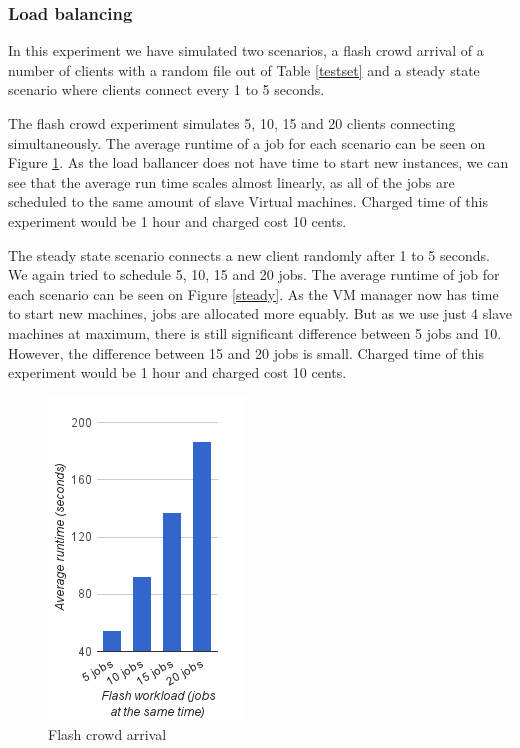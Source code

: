 
\subsubsection{Load balancing}
\label{load}
In this experiment we have simulated two scenarios, a flash crowd arrival of a number of clients with a random file out of Table \ref{testset} and a steady state scenario where clients connect every 1 to 5 seconds. 

The flash crowd experiment simulates 5, 10, 15 and 20 clients connecting simultaneously. The average runtime of a job for each scenario can be seen on Figure \ref{flash}. As the load ballancer does not have time to start new instances, we can see that the average run time scales almost linearly, as all of the jobs are scheduled to the same amount of slave Virtual machines. Charged time of this experiment would be 1 hour and charged cost 10 cents.

The steady state scenario connects a new client randomly after 1 to 5 seconds. We again tried to schedule 5, 10, 15 and 20 jobs. The average runtime of job for each scenario can be seen on Figure \ref{steady}. As the VM manager now has time to start new machines, jobs are allocated more equably. But as we use just 4 slave machines at maximum, there is still significant difference between 5 jobs and 10. However, the difference between 15 and 20 jobs is small. Charged time of this experiment would be 1 hour and charged cost 10 cents.

\begin{figure}
 \centering

 \includegraphics{flash-graph}
 \caption{Flash crowd arrival}
 \label{flash}
 \end{figure}

